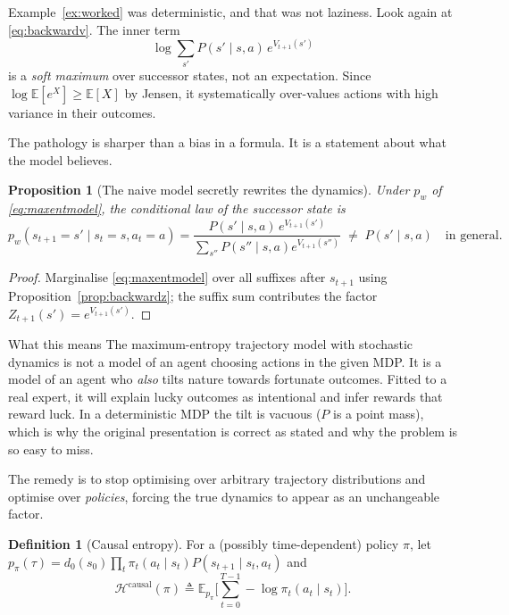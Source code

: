 \documentclass[11pt]{article}
\theoremstyle{plain}
\newtheorem{proposition}[theorem]{Proposition}
\theoremstyle{definition}
\newtheorem{definition}[theorem]{Definition}
\theoremstyle{remark}
\newcommand{\E}{\mathbb{E}}
\begin{document}
Example~\ref{ex:worked} was deterministic, and that was not laziness. Look
again at \eqref{eq:backwardv}. The inner term
\begin{equation}
\log \sum_{s'} P(s'\mid s,a)\, e^{V_{t+1}(s')}
\label{eq:innersoftmax}
\end{equation}
is a \emph{soft maximum} over successor states, not an expectation. Since
$\log\E[e^X] \ge \E[X]$ by Jensen, it systematically over-values actions
with high variance in their outcomes.

The pathology is sharper than a bias in a formula. It is a statement about
what the model believes.

\begin{proposition}[The naive model secretly rewrites the
dynamics]\label{prop:naivetrap}
Under $p_w$ of \eqref{eq:maxentmodel}, the conditional law of the
successor state is
\begin{equation}
p_w(s_{t+1}=s' \mid s_t=s, a_t=a) = \frac{P(s'\mid s,a)\,e^{V_{t+1}(s')}}
{\sum_{s''}P(s''\mid s,a)e^{V_{t+1}(s'')}} \;\ne\; P(s'\mid s,a) \quad
\text{in general.}
\label{eq:naivetrap}
\end{equation}
\end{proposition}

\begin{proof}
Marginalise \eqref{eq:maxentmodel} over all suffixes after $s_{t+1}$ using
Proposition~\ref{prop:backwardz}; the suffix sum contributes the factor
$Z_{t+1}(s') = e^{V_{t+1}(s')}$.
\end{proof}

\begin{redbox}{What this means}
The maximum-entropy trajectory model with stochastic dynamics is not a
model of an agent choosing actions in the given MDP. It is a model of an
agent who \emph{also} tilts nature towards fortunate outcomes. Fitted to a
real expert, it will explain lucky outcomes as intentional and infer
rewards that reward luck. In a deterministic MDP the tilt is vacuous ($P$
is a point mass), which is why the original presentation is correct as
stated and why the problem is so easy to miss.
\end{redbox}

The remedy is to stop optimising over arbitrary trajectory distributions
and optimise over \emph{policies}, forcing the true dynamics to appear as
an unchangeable factor.

\begin{definition}[Causal entropy]
For a (possibly time-dependent) policy $\pi$, let $p_\pi(\tau) =
d_0(s_0)\prod_t \pi_t(a_t\mid s_t)P(s_{t+1}\mid s_t,a_t)$ and
\begin{equation}
\mathcal{H}^{\mathrm{causal}}(\pi) \triangleq \E_{p_\pi}\Big[\sum_{t=0}^{T-1}
-\log \pi_t(a_t\mid s_t)\Big].
\label{eq:causalentropy}
\end{equation}
\end{definition}
\end{document}
